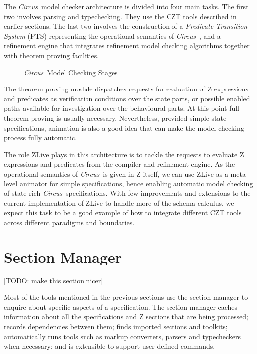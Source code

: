 \documentclass{llncs}
\newcommand{\Circus}{{\sf\slshape Circus}}
\begin{document}
    The \Circus\ model checker architecture is divided into four main tasks. The first
    two involves parsing and typechecking. They use the CZT tools described in earlier
    sections. The last two involves the construction of a \textit{Predicate Transition System}
    (PTS) representing the operational semantics of \Circus~\cite{circus.mc:opsem},
    and a refinement engine that integrates refinement model checking algorithms together
    with theorem proving facilities.
    \begin{figure}[t]
    \begin{center}
    \end{center}    \caption{\Circus\ Model Checking Stages}\label{mc-stages}
    \end{figure}
    The theorem proving module dispatches requests for evaluation of Z expressions and predicates
    as verification conditions over the state parts, or possible enabled paths available for
    investigation over the behavioural parts.
    At this point full theorem proving is usually necessary. Nevertheless, provided simple state
    specifications, animation is also a good idea that can make the model checking process fully
    automatic.

    The role ZLive plays in this architecture is to tackle the requests to evaluate
    Z expressions and predicates from the compiler and refinement engine.
    As the operational semantics of \Circus\ is given in Z itself, we can use ZLive as a
    meta-level animator for simple specifications, hence enabling automatic model checking
    of state-rich \Circus\ specifications.
    With few improvements and extensions to the current implementation of ZLive to handle
    more of the schema calculus, we expect this task to be a good example of how to integrate
    different CZT tools across different paradigms and boundaries.

\section{Section Manager}

  [TODO: make this section nicer]

  Most of the tools mentioned in the previous sections use the section
  manager to enquire about specific aspects of a specification.  The
  section manager caches information about all the specifications and
  Z sections that are being processed; records dependencies between
  them; finds imported sections and toolkits; automatically runs tools
  such as markup converters, parsers and typecheckers when necessary;
  and is extensible to support user-defined commands.
\end{document}

